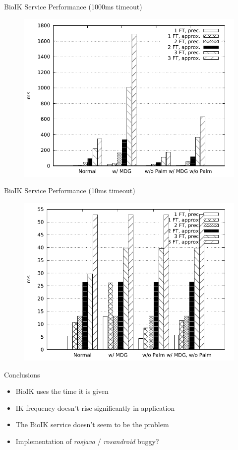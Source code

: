 \documentclass[t]{beamer}
\begin{document}
\begin{frame}{BioIK Service Performance (1000ms timeout)}
\begin{figure}
	\includegraphics[height=0.8\textheight]{assets/chpt_eval/1000ms.pdf}
\end{figure}
\end{frame}

\begin{frame}{BioIK Service Performance (10ms timeout)}
\begin{figure}
	\includegraphics[height=0.8\textheight]{assets/chpt_eval/10ms.pdf}
\end{figure}
\end{frame}

\begin{frame}{Conclusions}
\begin{itemize}
	\item BioIK uses the time it is given \cite{Ruppel17}
	\item IK frequency doesn't rise significantly in application
	\item The BioIK service doesn't seem to be the problem
	\item Implementation of \textit{rosjava} / \textit{rosandroid} buggy?
\end{itemize}
\end{frame}
\end{document}
